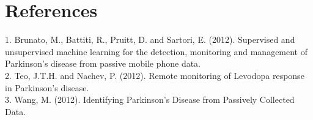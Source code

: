 \documentclass[8pt]{article}
\begin{document}
\section{References}
{\tiny
1. Brunato, M., Battiti, R., Pruitt, D. and Sartori, E. (2012). Supervised and unsupervised machine learning for the detection, monitoring and management of Parkinson's disease from passive mobile phone data. \\
2. Teo, J.T.H. and Nachev, P. (2012). Remote monitoring of Levodopa response in Parkinson's disease.\\
3. Wang, M. (2012). Identifying Parkinson’s Disease from Passively Collected Data.\\
}
\end{document}
